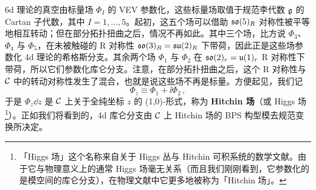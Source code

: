 6d 理论的真空由标量场 $\Phi_I$ 的 VEV 参数化，这些标量场取值于规范李代数 $\mathfrak{g}$ 的 Cartan 子代数，其中 $I=1,\ldots,5$。起初，这五个场可以借助 $\mathfrak{so}(5)_R$ 对称性被平等地相互转动；但在部分拓扑扭曲之后，情况不再如此。其中三个场，比方说 $\Phi_3$、$\Phi_4$ 与 $\Phi_5$，在未被触碰的 R 对称性 $\mathfrak{so}(3)_R=\mathfrak{su}(2)_R$ 下带荷，因此正是这些场参数化 4d 理论的希格斯分支。其余两个场 $\Phi_1$ 与 $\Phi_2$ 在 $\mathfrak{so}(2)_r=\mathfrak{u}(1)_r$ R 对称性下带荷，所以它们参数化库仑分支。注意，在部分拓扑扭曲之后，这个 R 对称性与 $\mathcal{C}$ 中的转动对称性发生了混合，也就是说这些场不再是标量。方便起见，我们记
\begin{equation}
  \Phi_z \equiv \Phi_1+\ii\Phi_2\,,
  \tag{4.3}
\end{equation}
于是 $\Phi_z\dd z$ 是 $\mathcal{C}$ 上关于全纯坐标 $z$ 的 (1,0)-形式，称为 \textbf{Hitchin 场}（或
Higgs 场\footnote{「Higgs 场」这个名称来自关于 Higgs 丛与 Hitchin 可积系统的数学文献。由于它与物理意义上的通常 Higgs 场毫无关系（而且我们刚刚看到，它参数化的是模空间的库仑分支），在物理文献中它更多地被称为「Hitchin 场」。}）。正如我们将看到的，4d 库仑分支由 $\mathcal{C}$ 上 Hitchin 场的 BPS 构型模去规范变换所决定。


